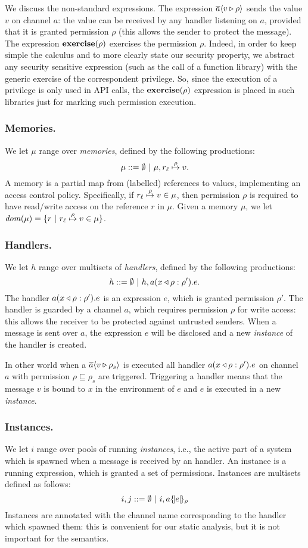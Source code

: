 We discuss the non-standard expressions. The expression
$\send{a}{v}{\rho}$ sends the value $v$ on channel $a$: the value can
be received by any handler listening on $a$, provided that it is
granted permission $\rho$ (this allows the sender to protect the
message). The expression $\exercise{\rho}$ exercises the permission
$\rho$. Indeed, in order to keep simple the calculus and to more
clearly state our security property, we abstract any
security sensitive expression (such as the call of a function library)
with the generic exercise of the correspondent privilege. So, since the execution of a privilege is only used in API calls, the $\exercise{\rho}$ expression is placed in such libraries just for marking such permission execution.

\subsubsection{Memories.}
We let $\mu$ range over \emph{memories}, defined by the following productions:
\[
\mu ::= \emptyset ~|~ \mu, \map{r_{\ell}}{\rho}{v}.
\]
A memory is a partial map from (labelled) references to values, implementing an access control policy. Specifically, if $\map{r_{\ell}}{\rho}{v} \in \mu$, then permission $\rho$ is required to have read/write access on the reference $r$ in $\mu$. Given a memory $\mu$, we let $\dom(\mu) = \{r ~|~ \map{r_{\ell}}{\rho}{v} \in \mu\}$.

\subsubsection{Handlers.} 
We let $h$ range over multisets of \emph{handlers}, defined by the following productions:
\[
h ::= \emptyset ~|~ h,\handler{a}{x}{\rho}{e}{\rho'}.
\]
The handler $\handler{a}{x}{\rho}{e}{\rho'}$ is an expression $e$, which is granted permission $\rho'$. The handler is guarded by a channel $a$, which requires permission $\rho$ for write access: this allows the receiver to be protected against untrusted senders. When a message is sent over $a$, the expression $e$ will be disclosed and a new \emph{instance} of the handler is created.

In other world when a $\send{a}{v}{\rho_s}$ is executed all handler $\handler{a}{x}{\rho}{e}{\rho'}$ on channel $a$ with permission $\rho \sqsubseteq \rho_s$ are triggered. Triggering a handler means that the message $v$ is bound to $x$ in the environment of $e$ and $e$ is executed in a new \emph{instance}.

\subsubsection{Instances.} 
We let $i$ range over pools of running \emph{instances}, i.e., the active part of a system which is spawned when a message is received by an handler. An instance is a running expression, which is granted a set of permissions. Instances are multisets defined as follows:
\[
i,j ::= \emptyset ~|~ i,\inst{a}{e}{\rho}
\]
Instances are annotated with the channel name corresponding to the handler which spawned them: this is convenient for our static analysis, but it is not important for the semantics.

